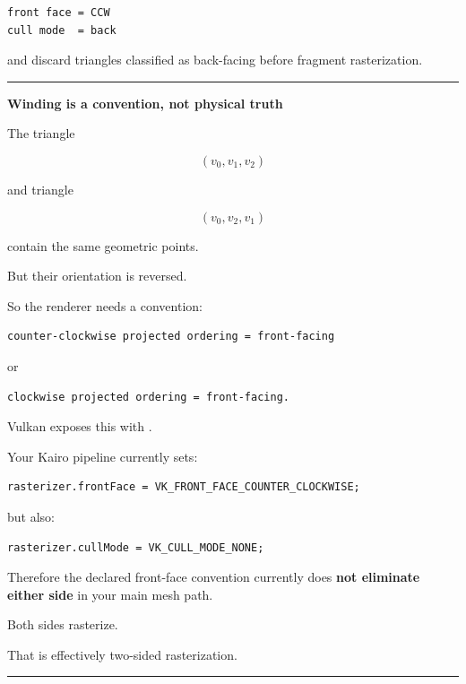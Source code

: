 \begin{verbatim}
front face = CCW
cull mode  = back
\end{verbatim}

and discard triangles classified as back-facing before fragment rasterization.

\begin{center}\rule{0.5\linewidth}{0.5pt}\end{center}

\textbf{Winding is a convention, not physical truth}

The triangle

\[
(v_0,v_1,v_2)
\]

and triangle

\[
(v_0,v_2,v_1)
\]

contain the same geometric points.

But their orientation is reversed.

So the renderer needs a convention:

\begin{verbatim}
counter-clockwise projected ordering = front-facing
\end{verbatim}

or

\begin{verbatim}
clockwise projected ordering = front-facing.
\end{verbatim}

Vulkan exposes this with .

Your Kairo pipeline currently sets:

\begin{verbatim}
rasterizer.frontFace = VK_FRONT_FACE_COUNTER_CLOCKWISE;
\end{verbatim}

but also:

\begin{verbatim}
rasterizer.cullMode = VK_CULL_MODE_NONE;
\end{verbatim}

Therefore the declared front-face convention currently does \textbf{not eliminate either side} in your main mesh path.

Both sides rasterize.

That is effectively two-sided rasterization.

\begin{center}\rule{0.5\linewidth}{0.5pt}\end{center}

